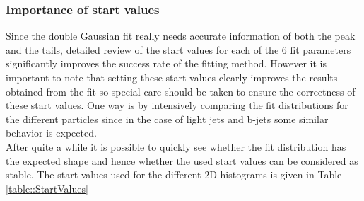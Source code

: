 \subsubsection{Importance of start values}
Since the double Gaussian fit really needs accurate information of both the peak and the tails, detailed review of the start values for each of the $6$ fit parameters significantly improves the success rate of the fitting method. However it is important to note that setting these start values clearly improves the results obtained from the fit so special care should be taken to ensure the correctness of these start values. One way is by intensively comparing the fit distributions for the different particles since in the case of light jets and b-jets some similar behavior is expected.\\
After quite a while it is possible to quickly see whether the fit distribution has the expected shape and hence whether the used start values can be considered as stable. The start values used for the different 2D histograms is given in Table \ref{table::StartValues}
